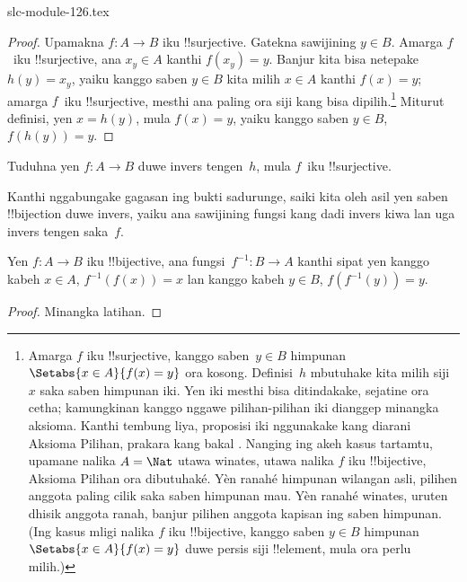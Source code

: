 \begin{filecontents*}[overwrite]{slc-module-126.tex}
\begin{proof}
Upamakna $f\colon A \to B$ iku !!{surjective}. Gatekna sawijining $y \in
B$. Amarga $f$~iku !!{surjective}, ana $x_y \in A$ kanthi $f(x_y)
= y$. Banjur kita bisa netepake $h(y) = x_y$, yaiku kanggo saben $y \in B$
kita milih $x \in A$ kanthi $f(x) = y$; amarga $f$~iku !!{surjective},
mesthi ana paling ora siji kang bisa dipilih.\footnote{Amarga $f$ iku
!!{surjective}, kanggo saben~$y \in B$ himpunan $\Setabs{x \in A}{f(x) = y}$
ora kosong. Definisi~$h$ mbutuhake kita milih siji $x$
saka saben himpunan iki. Yen iki mesthi bisa ditindakake, sejatine ora
cetha; kamungkinan kanggo nggawe pilihan-pilihan iki dianggep minangka aksioma.
Kanthi tembung liya, proposisi iki nggunakake kang diarani Aksioma
Pilihan, prakara kang bakal .
Nanging ing akeh kasus tartamtu, upamane nalika $A = \Nat$ utawa winates, utawa nalika $f$ iku !!{bijective},
Aksioma Pilihan ora dibutuhaké. Yèn ranahé himpunan wilangan asli,
pilihen anggota paling cilik saka saben himpunan mau. Yèn ranahé winates,
uruten dhisik anggota ranah, banjur pilihen anggota kapisan ing saben himpunan.
(Ing kasus mligi nalika $f$ iku !!{bijective}, kanggo saben $y \in B$ himpunan
$\Setabs{x \in A}{f(x) = y}$ duwe persis siji !!{element}, mula ora perlu milih.)}
Miturut definisi, yen $x = h(y)$,
mula $f(x) = y$, yaiku kanggo saben $y \in B$, $f(h(y)) = y$.
\end{proof}

\begin{prob}
Tuduhna yen $f\colon A \to B$ duwe invers tengen~$h$, mula $f$~iku
!!{surjective}.
\end{prob}

\begin{explain}
  Kanthi nggabungake gagasan ing bukti sadurunge, saiki kita oleh asil yen saben
  !!{bijection} duwe invers, yaiku ana sawijining fungsi
  kang dadi invers kiwa lan uga invers tengen saka~$f$.
\end{explain}

\begin{prop}
Yen $f\colon A \to B$ iku !!{bijective}, ana
fungsi~$f^{-1}\colon B \to A$ kanthi sipat yen kanggo kabeh $x \in A$,
$f^{-1}(f(x)) = x$ lan kanggo kabeh $y \in B$, $f(f^{-1}(y)) = y$.
\end{prop}

\begin{proof}
Minangka latihan.
\end{proof}


\end{filecontents*}

